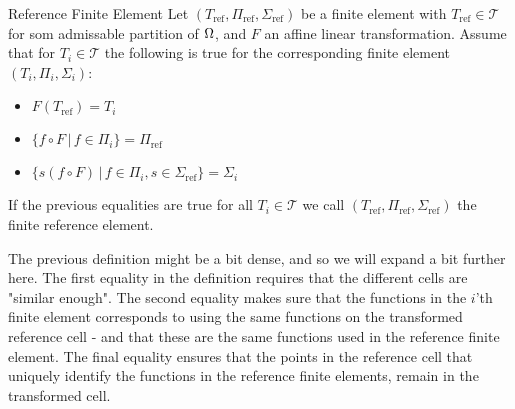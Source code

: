 \iffalse \begin{defn}{Affine Family}
    A family of finite element spaces $S_h$ for partitions $\mathcal{T}_h$ of 
    $\OO\subset \RR^d$ is called an affine family if there exists a finite reference
    element $(T_{\text{ref}}, \Pi_{\text{ref}},\Sigma)$, such that, beside the 
    usual properties of a finite element, there exists some affine mappings 
    $F_j:T_{\text{ref}}\to T_j$ such that
    \begin{equation*}
        \forall v \in S_h \,\,\land \,\, \forall x \in T_j:\,\, v(x) = p(F^{-1}_j(x)) \quad 
        p \in \Pi_{\text{ref}}.
    \end{equation*}
    Meaning, when restricting $v\in S_h$ to some $T_j$, we can fully describe 
    $v$ using some affine mapping and an element in $\Pi_{\text{ref}}$.
\end{defn}
\fi
\begin{defn}{Reference Finite Element} 
    Let $(T_{\text{ref}}, \Pi_{\text{ref}},\Sigma_{\text{ref}})$ be a finite element 
    with $T_{\text{ref}}\in \mathcal{T}$ for som admissable partition of 
    $\Omega$, and 
    $F$ an affine linear transformation. 
    Assume that for $T_i\in\mathcal{T}$ the following 
    is true for the corresponding finite element $(T_i, \Pi_i,\Sigma_i)$:
    \begin{itemize}
        \item $F(T_{\text{ref}}) = T_i$
        \item $\{ f\circ F \,|\,  f \in \Pi_i \} =\Pi_{\text{ref}}  $
        \item $\{ s(f\circ F) \,|\, f \in \Pi_i, s \in \Sigma_{\text{ref}} \} = \Sigma_i$
    \end{itemize}
    If the previous equalities are true for all $T_i\in \mathcal{T}$ we call 
    $(T_{\text{ref}}, \Pi_{\text{ref}},\Sigma_{\text{ref}})$ the finite reference 
    element.
\end{defn}
The previous definition might be a bit dense, and so we will expand a bit 
further here. The first equality in the definition requires that the 
different cells are "similar enough". The second equality makes sure 
that the functions in the $i$'th finite element corresponds 
to using the same  
functions on the transformed reference cell - and that these are the 
same functions used in the reference finite element.
The final equality ensures that the points in the reference cell that 
uniquely identify the functions in the reference finite elements, 
remain in the transformed cell.